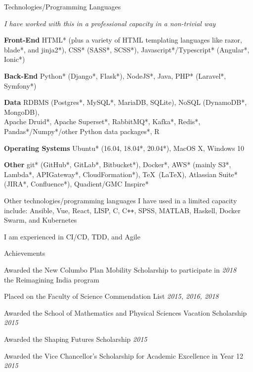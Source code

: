 \documentclass{resume} %
\begin{document}
\begin{rSection}{Technologies/Programming Languages}
    \item {\em * I have worked with this in a professional capacity in a non-trivial way}
    \item {\bf Front-End} HTML* (plus a variety of HTML templating languages like razor,
    blade*, and jinja2*), CSS* (SASS*, SCSS*), Javascript*/Typescript* (Angular*, Ionic*)
    \item {\bf Back-End} Python* (Django*, Flask*), NodeJS*, Java, PHP* (Laravel*, Symfony*)
    \item {\bf Data} RDBMS (Postgres*, MySQL*, MariaDB, SQLite), NoSQL (DynamoDB*, MongoDB),
    \\ Apache Druid*, Apache Superset*, RabbitMQ*, Kafka*, Redis*, Pandas*/Numpy*/other Python data packages*, R
    \item {\bf Operating Systems} Ubuntu* (16.04, 18.04*, 20.04*), MacOS X, Windows 10
    \item {\bf Other} git* (GitHub*, GitLab*, Bitbucket*), Docker*, AWS* (mainly S3*, Lambda*, APIGateway*, CloudFormation*), \TeX\ (\LaTeX),
    Atlassian Suite* (JIRA*, Confluence*), Quadient/GMC Inspire*
    \item Other technologies/programming languages I have used in a limited capacity include:
    Ansible, Vue, React, LISP, C, C\texttt{++}, SPSS, MATLAB, Haskell, Docker Swarm, and Kubernetes
    \item I am experienced in CI/CD, TDD, and Agile
\end{rSection}


\begin{rSection}{Achievements}
    \item Awarded the New Columbo Plan Mobility Scholarship to participate in \hfill {\em 2018}
    \\ the Reimagining India program
    \item Placed on the Faculty of Science Commendation List \hfill {\em 2015, 2016, 2018}
    \item Awarded the School of Mathematics and Physical Sciences Vacation Scholarship
    \hfill {\em 2015}
    \item Awarded the Shaping Futures Scholarship \hfill {\em 2015} \
    \item Awarded the Vice Chancellor's Scholarship for Academic Excellence in Year 12 \hfill {\em 2015}
\end{rSection}
\end{document}

